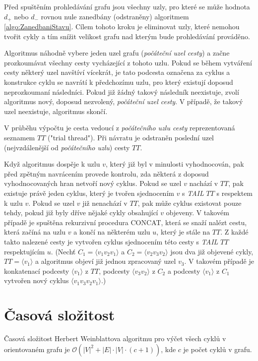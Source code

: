         Před spuštěním prohledávání grafu jsou všechny uzly, pro které se může hodnota $d_+$ nebo $d_-$ rovnou nule zanedbány (odstraněny) algoritmem \ref{algo:ZanedbaniStavu}. Cílem tohoto kroku je eliminovat uzly, které nemohou tvořit cykly a tím snížit velikost grafu nad kterým bude prohledávání prováděno.

        Algoritmus náhodně vybere jeden uzel grafu (\textit{počáteční uzel cesty}) a začne prozkoumávat všechny cesty vycházející z tohoto uzlu. Pokud se během vytváření cesty některý uzel navštíví vícekrát, je tato podcesta označena za cyklus a konstrukce cyklu se navrátí k předchozímu uzlu, pro který existují doposud neprozkoumaní následníci. Pokud již žádný takový následník neexistuje, zvolí algoritmus nový, doposud nezvolený, \textit{počáteční uzel cesty}. V případě, že takový uzel neexistuje, algoritmus skončí.

        V průběhu výpočtu je cesta vedoucí z \textit{počátečního uzlu cesty} reprezentovaná seznamem $TT$ ("trial thread"). Při návratu je odstraněn poslední uzel (nejvzdálenější od \textit{počátečního uzlu}) cesty $TT$.

        Když algoritmus dospěje k uzlu $v$, který již byl v minulosti vyhodnocován, pak před zpětným navrácením provede kontrolu, zda některá z doposud vyhodnocovaných hran netvoří nový cyklus. Pokud se uzel $v$ nachází v $TT$, pak existuje právě jeden cyklus, který je tvořen sjednocením $v$ s \textit{TAIL} $TT$ s respektem k uzlu $v$. Pokud se uzel $v$ již nenachází v $TT$, pak může cyklus existovat pouze tehdy, pokud již byly dříve nějaké cykly obsahující $v$ objeveny. V takovém případě je spuštěna rekurzivní procedura CONCAT, která se snaží nalézt cestu, která začíná na uzlu $v$ a končí na některém uzlu $u$, který je stále na $TT$. Z každé takto nalezené cesty je vytvořen cyklus sjednocením této cesty s \textit{TAIL} $TT$ respektujícím $u$. (Nechť $C_1 = \langle v_1v_2v_1 \rangle$ a $C_2 = \langle v_2v_3v_2 \rangle$ jsou dva již objevené cykly, $TT = \langle v_1 \rangle$ a algoritmus objeví již jednou zpracovaný uzel $v_3$. V takovém případě je konkatenací podcesty $\langle v_1 \rangle$ z $TT$, podcesty $\langle v_3v_2 \rangle$ z $C_2$ a podcesty $\langle v_1 \rangle$ z $C_1$ vytvořen nový cyklus $\langle v_1v_3v_2v_1 \rangle$.)

    \section{Časová složitost}
        \begin{theorem}
            Časová složitost Herbert Weinblattova algoritmu pro výčet všech cyklů v orientovaném grafu je $\mathcal{O}(|V|^2 + |E|\cdot|V|\cdot(c + 1))$, kde $c$ je počet cyklů v grafu.
        \end{theorem}

